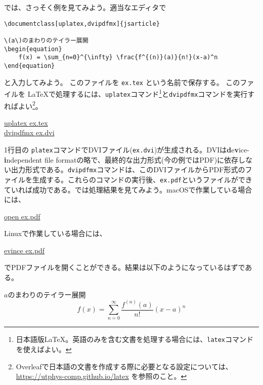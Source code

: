 では、さっそく例を見てみよう。適当なエディタで
\begin{reidai}
    \label{reidai:latex:ex}
    \begin{verbatim}
\documentclass[uplatex,dvipdfmx]{jsarticle}

\(a\)のまわりのテイラー展開
\begin{equation}
    f(x) = \sum_{n=0}^{\infty} \frac{f^{(n)}(a)}{n!}(x-a)^n
\end{equation}

\end{verbatim}
\end{reidai} \noindent
と入力してみよう。
このファイルを \texttt{ex.tex} という名前で保存する。
このファイルを \LaTeX で処理するには、\texttt{uplatex}コマンド\footnote{日本語版\LaTeX 。英語のみを含む文書を処理する場合には、\texttt{latex}コマンドを使えばよい。}と\texttt{dvipdfmx}コマンドを実行すればよい\footnote{Overleafで日本語の文書を作成する際に必要となる設定については、 \url{https://utphys-comp.github.io/latex} を参照のこと。}。
\begin{commandline2}
    \prompt \underline{uplatex ex.tex}\\
    \prompt \underline{dvipdfmx ex.dvi}
\end{commandline2} \noindent
1行目の \texttt{platex}コマンドでDVIファイル(\texttt{ex.dvi})が生成される。DVIは{\textbf{d}e\textbf{v}ice-\textbf{i}ndependent file format}の略で、最終的な出力形式(今の例ではPDF)に依存しない出力形式である。\texttt{dvipdfmx}コマンドは、このDVIファイルからPDF形式のファイルを生成する。これらのコマンドの実行後、\texttt{ex.pdf}というファイルができていれば成功である。では処理結果を見てみよう。macOSで作業している場合には、
\begin{commandline2}
    \prompt \underline{open ex.pdf}
\end{commandline2} \noindent
Linuxで作業している場合には、
\begin{commandline2}
    \prompt \underline{evince ex.pdf}
\end{commandline2} \noindent
でPDFファイルを開くことができる。結果は以下のようになっているはずである。
\renewcommand{\theequation}{1}
\begin{kekka}
    \label{kekka:ex}
    \(a\)のまわりのテイラー展開
    \begin{equation}
        f(x) = \sum_{n=0}^{\infty} \frac{f^{(n)}(a)}{n!}(x-a)^n
    \end{equation}
    \vspace{0pt}
\end{kekka}

